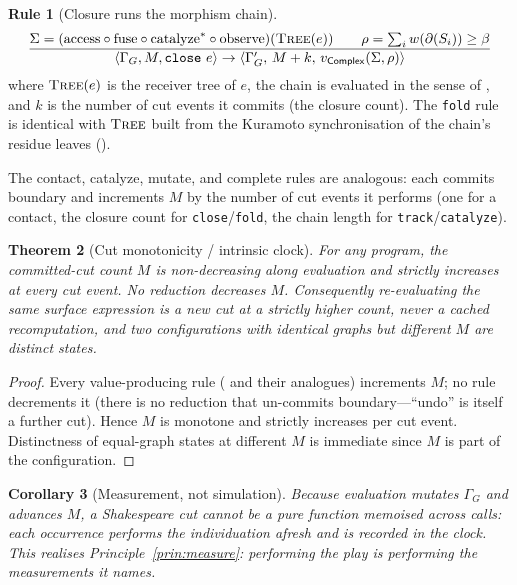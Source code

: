 \documentclass[11pt,a4paper]{article}
\theoremstyle{thmstyle}
\newtheorem{theorem}{Theorem}[section]
\newtheorem{corollary}[theorem]{Corollary}
\theoremstyle{definition}
\newtheorem{rulename}[theorem]{Rule}
\theoremstyle{remark}
\newcommand{\flo}{\beta}
\newcommand{\res}{\rho}
\newcommand{\cut}{\partial}
\newcommand{\Sig}{\Sigma}
\newcommand{\shk}[1]{\texttt{#1}}
\begin{document}
\begin{rulename}[Closure runs the morphism chain]
\label{rule:chain-step}
\[
\frac{\Sig=(\mathrm{access}\circ\mathrm{fuse}\circ\mathrm{catalyze}^{*}
      \circ\mathrm{observe})(\textsc{Tree}(e))\qquad
      \res=\textstyle\sum_i w(\cut(S_i))\ge\flo}
     {\langle\Gamma_G,M,\shk{close}\ e\rangle \to
      \langle\Gamma_G',\,M+k,\,v_{\mathsf{Complex}}(\Sig,\res)\rangle}
\]
where $\textsc{Tree}(e)$ is the receiver tree of $e$, the chain is
evaluated in the sense of , and $k$ is the number of
cut events it commits (the closure count). The \shk{fold} rule is
identical with $\textsc{Tree}$ built from the Kuramoto synchronisation of
the chain's residue leaves ().
\end{rulename}

The contact, catalyze, mutate, and complete rules are analogous: each
commits boundary and increments $M$ by the number of cut events it
performs (one for a contact, the closure count for \shk{close}/\shk{fold},
the chain length for \shk{track}/\shk{catalyze}).

\begin{theorem}[Cut monotonicity / intrinsic clock]
\label{thm:monotone}
For any program, the committed-cut count $M$ is non-decreasing along
evaluation and strictly increases at every cut event. No reduction
decreases $M$. Consequently re-evaluating the same surface expression is a
new cut at a strictly higher count, never a cached recomputation, and two
configurations with identical graphs but different $M$ are distinct
states.
\end{theorem}

\begin{proof}
Every value-producing rule ( and their
analogues) increments $M$; no rule decrements it (there is no reduction
that un-commits boundary---``undo'' is itself a further cut). Hence $M$ is
monotone and strictly increases per cut event. Distinctness of equal-graph
states at different $M$ is immediate since $M$ is part of the
configuration.
\end{proof}

\begin{corollary}[Measurement, not simulation]
\label{cor:measure}
Because evaluation mutates $\Gamma_G$ and advances $M$, a Shakespeare cut
cannot be a pure function memoised across calls: each occurrence performs
the individuation afresh and is recorded in the clock. This realises
Principle~\ref{prin:measure}: performing the play \emph{is} performing the
measurements it names.
\end{corollary}
\end{document}
